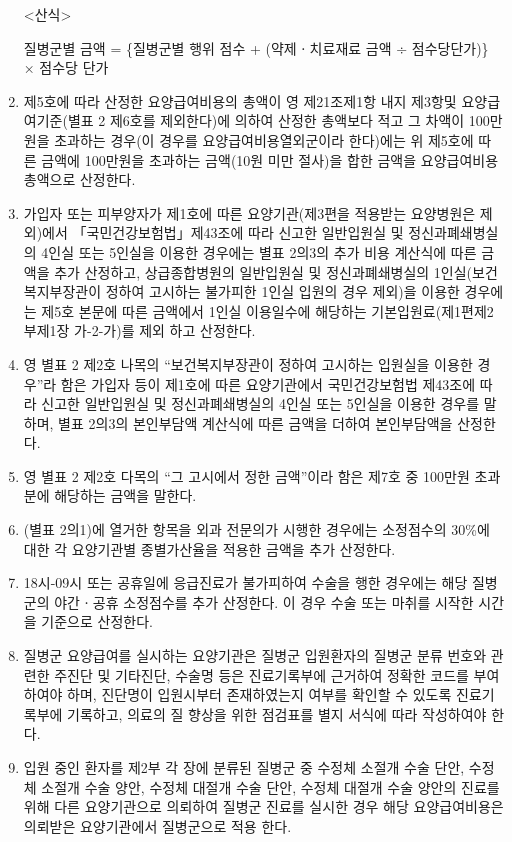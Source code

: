 \begin{enumerate}[1.]
<산식> \par
질병군별 금액 = \{질병군별 행위 점수 + (약제ㆍ치료재료 금액 ÷ 점수당단가)\} × 점수당 단가
\item 제5호에 따라 산정한 요양급여비용의 총액이 영 제21조제1항 내지 제3항및 요양급여기준(별표 2 제6호를 제외한다)에 의하여 산정한 총액보다 적고 그 차액이 100만원을 초과하는 경우(이 경우를 요양급여비용열외군이라 한다)에는 위 제5호에 따른 금액에 100만원을 초과하는 금액(10원 미만 절사)을 합한 금액을 요양급여비용 총액으로 산정한다.
\item 가입자 또는 피부양자가 제1호에 따른 요양기관(제3편을 적용받는 요양병원은 제외)에서 「국민건강보험법」제43조에 따라 신고한 일반입원실 및 정신과폐쇄병실의 4인실 또는 5인실을 이용한 경우에는 별표 2의3의 추가 비용 계산식에 따른 금액을 추가 산정하고, 상급종합병원의 일반입원실 및 정신과폐쇄병실의 1인실(보건복지부장관이 정하여 고시하는 불가피한 1인실 입원의 경우 제외)을 이용한 경우에는 제5호 본문에 따른 금액에서 1인실 이용일수에 해당하는 기본입원료(제1편제2부제1장 가-2-가)를 제외 하고 산정한다.
\item 영 별표 2 제2호 나목의 “보건복지부장관이 정하여 고시하는 입원실을 이용한 경우”라 함은 가입자 등이 제1호에 따른 요양기관에서 국민건강보험법 제43조에 따라 신고한 일반입원실 및 정신과폐쇄병실의 4인실 또는 5인실을 이용한 경우를 말하며, 별표 2의3의 본인부담액 계산식에 따른 금액을 더하여 본인부담액을 산정한다.
\item 영 별표 2 제2호 다목의 “그 고시에서 정한 금액”이라 함은 제7호 중 100만원 초과분에 해당하는 금액을 말한다.
\item (별표 2의1)에 열거한 항목을 외과 전문의가 시행한 경우에는 소정점수의 30\%에 대한 각 요양기관별 종별가산율을 적용한 금액을 추가 산정한다.
\item 18시-09시 또는 공휴일에 응급진료가 불가피하여 수술을 행한 경우에는 해당 질병군의 야간ㆍ공휴 소정점수를 추가 산정한다. 이 경우 수술 또는 마취를 시작한 시간을 기준으로 산정한다.
\item 질병군 요양급여를 실시하는 요양기관은 질병군 입원환자의 질병군 분류 번호와 관련한 주진단 및 기타진단, 수술명 등은 진료기록부에 근거하여 정확한 코드를 부여하여야 하며, 진단명이 입원시부터 존재하였는지 여부를 확인할 수 있도록 진료기록부에 기록하고, 의료의 질 향상을 위한 점검표를 별지 서식에 따라 작성하여야 한다.
\item 입원 중인 환자를 제2부 각 장에 분류된 질병군 중 수정체 소절개 수술 단안, 수정체 소절개 수술 양안, 수정체 대절개 수술 단안, 수정체 대절개 수술 양안의 진료를 위해 다른 요양기관으로 의뢰하여 질병군 진료를 실시한 경우 해당 요양급여비용은 의뢰받은 요양기관에서 질병군으로 적용 한다.

\end{enumerate}
